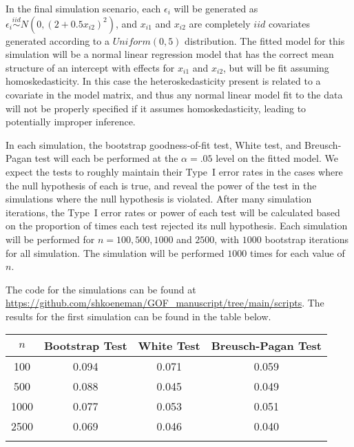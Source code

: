 \documentclass[12pt]{article} %
\theoremstyle{definition}
\begin{document}
In the final simulation scenario, each $\epsilon_i$ will be generated as $\epsilon_i \stackrel{iid}{\sim} N \left( 0,(2 + 0.5 x_{i2})^2 \right)$, and $x_{i1}$ and $x_{i2}$ are completely $iid$ covariates generated according to
a $Uniform(0,5)$ distribution. The fitted model for this simulation will be a normal linear regression model that has the correct mean structure of an intercept with effects for $x_{i1}$ and $x_{i2}$,
but will be fit assuming homoskedasticity. In this case the heteroskedasticity present is related to a covariate in the model matrix, and thus any normal linear model fit to the data will not be properly
specified if it assumes homoskedasticity, leading to potentially improper inference.

In each simulation, the bootstrap goodness-of-fit test, White test, and Breusch-Pagan test will each be performed at the $\alpha = .05$ level on the  fitted model. We expect the tests to roughly maintain their
Type~I error rates in the cases where the null hypothesis of each is true, and reveal the power of the test in the simulations where the null hypothesis is violated. After many simulation iterations, the
Type~I error rates or power of each test will be calculated based on the proportion of times each test rejected its null hypothesis. Each simulation will be performed for $n = 100, 500, 1000$ and $2500$, with $1000$
bootstrap iterations for all simulation. The simulation will be performed $1000$ times for each value of $n$.

The code for the simulations can be found at \url{https://github.com/shkoeneman/GOF_manuscript/tree/main/scripts}. The results for the first simulation
can be found in the table below.

\begin{table}[H]
	\centering
	\small\addtolength{\tabcolsep}{-3pt}
	\setlength\extrarowheight{-3pt}
	{
	\begin{tabular}{ c|c|c|c}
	$n$ & Bootstrap Test & White Test & Breusch-Pagan Test \\
	 \hline
	 100 & 0.094 & 0.071 & 0.059 \\
	 500 & 0.088 & 0.045 & 0.049 \\
	 1000 & 0.077 & 0.053 & 0.051 \\
	 2500 & 0.069 & 0.046 & 0.040 \\
	 \Xhline{3\arrayrulewidth}
	\end{tabular}
	}
\end{table}
\end{document}
